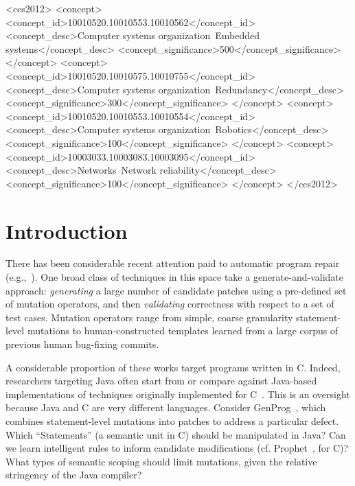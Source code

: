 \documentclass{sig-alternate-05-2015}
\begin{document}
%
%
\begin{CCSXML}
<ccs2012>
 <concept>
  <concept_id>10010520.10010553.10010562</concept_id>
  <concept_desc>Computer systems organization~Embedded systems</concept_desc>
  <concept_significance>500</concept_significance>
 </concept>
 <concept>
  <concept_id>10010520.10010575.10010755</concept_id>
  <concept_desc>Computer systems organization~Redundancy</concept_desc>
  <concept_significance>300</concept_significance>
 </concept>
 <concept>
  <concept_id>10010520.10010553.10010554</concept_id>
  <concept_desc>Computer systems organization~Robotics</concept_desc>
  <concept_significance>100</concept_significance>
 </concept>
 <concept>
  <concept_id>10003033.10003083.10003095</concept_id>
  <concept_desc>Networks~Network reliability</concept_desc>
  <concept_significance>100</concept_significance>
 </concept>
</ccs2012>  
\end{CCSXML}


%
%

%
%
\printccsdesc



\section{Introduction}

There has been considerable recent attention paid to automatic
program repair (e.g.,~\cite{kim2013,legoues2012,
  Mechtaev15,Long2016}).
%
One broad class of techniques in this space take a generate-and-validate
approach: \emph{generating} a large number of candidate patches using a
pre-defined set of mutation operators, and then \emph{validating} correctness with
respect to a set of test cases.  Mutation operators range from simple, coarse
granularity statement-level mutations to human-constructed templates learned
from a large corpus of previous human bug-fixing commits.

A considerable proportion of these works target programs written in C.
Indeed, researchers targeting Java often start from or compare against
Java-based implementations of techniques originally
implemented for C~\cite{nopol,kim2013}. %
%
This is an oversight because Java and C are very different languages.
Consider GenProg~\cite{legoues2012}, which
combines statement-level mutations into patches to address a particular
defect. Which ``Statements'' (a semantic unit in C) should be manipulated in Java?
Can we learn
intelligent rules to inform candidate modifications
(cf. Prophet~\cite{Long2016}, for C)?  What types of semantic scoping
should limit mutations, given the relative stringency of the Java
compiler?
\end{document}
